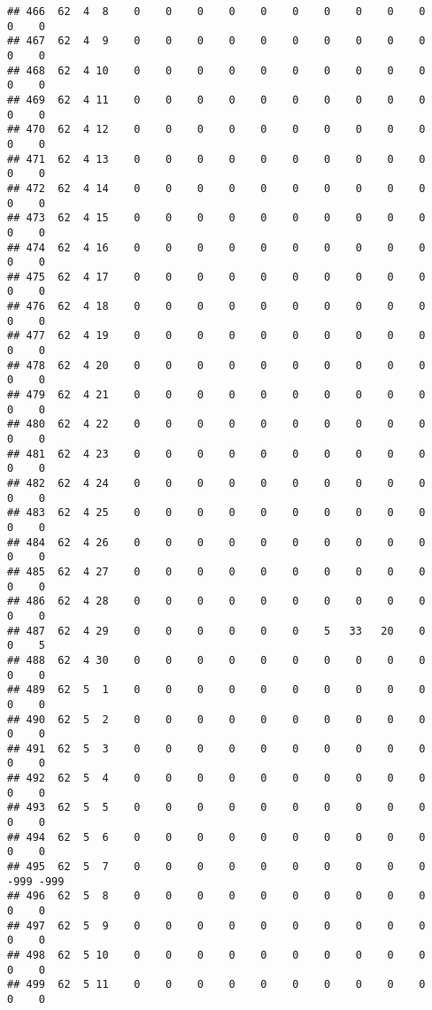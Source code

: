 \documentclass[]{article}
\begin{document}
\begin{verbatim}
## 466  62  4  8    0    0    0    0    0    0    0    0    0    0    0    0
## 467  62  4  9    0    0    0    0    0    0    0    0    0    0    0    0
## 468  62  4 10    0    0    0    0    0    0    0    0    0    0    0    0
## 469  62  4 11    0    0    0    0    0    0    0    0    0    0    0    0
## 470  62  4 12    0    0    0    0    0    0    0    0    0    0    0    0
## 471  62  4 13    0    0    0    0    0    0    0    0    0    0    0    0
## 472  62  4 14    0    0    0    0    0    0    0    0    0    0    0    0
## 473  62  4 15    0    0    0    0    0    0    0    0    0    0    0    0
## 474  62  4 16    0    0    0    0    0    0    0    0    0    0    0    0
## 475  62  4 17    0    0    0    0    0    0    0    0    0    0    0    0
## 476  62  4 18    0    0    0    0    0    0    0    0    0    0    0    0
## 477  62  4 19    0    0    0    0    0    0    0    0    0    0    0    0
## 478  62  4 20    0    0    0    0    0    0    0    0    0    0    0    0
## 479  62  4 21    0    0    0    0    0    0    0    0    0    0    0    0
## 480  62  4 22    0    0    0    0    0    0    0    0    0    0    0    0
## 481  62  4 23    0    0    0    0    0    0    0    0    0    0    0    0
## 482  62  4 24    0    0    0    0    0    0    0    0    0    0    0    0
## 483  62  4 25    0    0    0    0    0    0    0    0    0    0    0    0
## 484  62  4 26    0    0    0    0    0    0    0    0    0    0    0    0
## 485  62  4 27    0    0    0    0    0    0    0    0    0    0    0    0
## 486  62  4 28    0    0    0    0    0    0    0    0    0    0    0    0
## 487  62  4 29    0    0    0    0    0    0    5   33   20    0    0    5
## 488  62  4 30    0    0    0    0    0    0    0    0    0    0    0    0
## 489  62  5  1    0    0    0    0    0    0    0    0    0    0    0    0
## 490  62  5  2    0    0    0    0    0    0    0    0    0    0    0    0
## 491  62  5  3    0    0    0    0    0    0    0    0    0    0    0    0
## 492  62  5  4    0    0    0    0    0    0    0    0    0    0    0    0
## 493  62  5  5    0    0    0    0    0    0    0    0    0    0    0    0
## 494  62  5  6    0    0    0    0    0    0    0    0    0    0    0    0
## 495  62  5  7    0    0    0    0    0    0    0    0    0    0 -999 -999
## 496  62  5  8    0    0    0    0    0    0    0    0    0    0    0    0
## 497  62  5  9    0    0    0    0    0    0    0    0    0    0    0    0
## 498  62  5 10    0    0    0    0    0    0    0    0    0    0    0    0
## 499  62  5 11    0    0    0    0    0    0    0    0    0    0    0    0

\end{verbatim}
\end{document}
